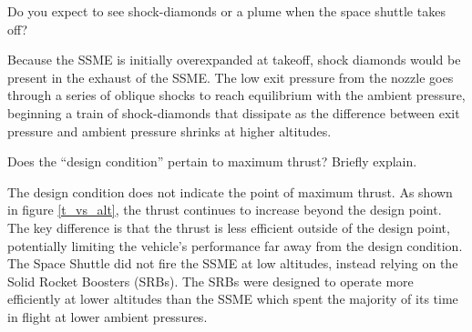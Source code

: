 \documentclass[../main.tex]{subfiles}
\begin{document}

Do you expect to see shock-diamonds or a plume when the space shuttle takes off?

\discussion{}

Because the SSME is initially overexpanded at takeoff, shock diamonds would be present in the exhaust of the SSME.
The low exit pressure from the nozzle goes through a series of oblique shocks to reach equilibrium with the ambient pressure, beginning a train of shock-diamonds that dissipate as the difference between exit pressure and ambient pressure shrinks at higher altitudes.


Does the ``design condition'' pertain to maximum thrust? Briefly explain.

\discussion{}

The design condition does not indicate the point of maximum thrust.
As shown in figure \ref{t_vs_alt}, the thrust continues to increase beyond the design point.
The key difference is that the thrust is less efficient outside of the design point, potentially limiting the vehicle's performance far away from the design condition.
The Space Shuttle did not fire the SSME at low altitudes, instead relying on the Solid Rocket Boosters (SRBs). 
The SRBs were designed to operate more efficiently at lower altitudes than the SSME which spent the majority of its time in flight at lower ambient pressures.
\end{document}
